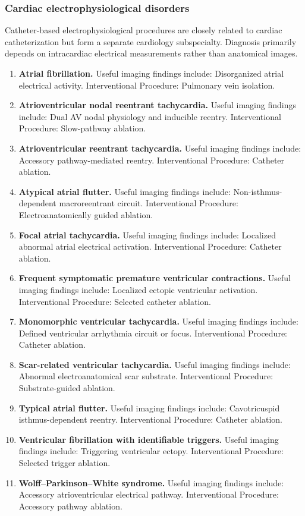 \subsubsection{Cardiac electrophysiological disorders}
Catheter-based electrophysiological procedures are closely related to cardiac catheterization but form a separate cardiology subspecialty. Diagnosis primarily depends on intracardiac electrical measurements rather than anatomical images.
\begin{enumerate}[leftmargin=*,itemsep=0.45em,topsep=0.4em]
\item \textbf{Atrial fibrillation.} Useful imaging findings include: Disorganized atrial electrical activity. Interventional Procedure: Pulmonary vein isolation.
\item \textbf{Atrioventricular nodal reentrant tachycardia.} Useful imaging findings include: Dual AV nodal physiology and inducible reentry. Interventional Procedure: Slow-pathway ablation.
\item \textbf{Atrioventricular reentrant tachycardia.} Useful imaging findings include: Accessory pathway-mediated reentry. Interventional Procedure: Catheter ablation.
\item \textbf{Atypical atrial flutter.} Useful imaging findings include: Non-isthmus-dependent macroreentrant circuit. Interventional Procedure: Electroanatomically guided ablation.
\item \textbf{Focal atrial tachycardia.} Useful imaging findings include: Localized abnormal atrial electrical activation. Interventional Procedure: Catheter ablation.
\item \textbf{Frequent symptomatic premature ventricular contractions.} Useful imaging findings include: Localized ectopic ventricular activation. Interventional Procedure: Selected catheter ablation.
\item \textbf{Monomorphic ventricular tachycardia.} Useful imaging findings include: Defined ventricular arrhythmia circuit or focus. Interventional Procedure: Catheter ablation.
\item \textbf{Scar-related ventricular tachycardia.} Useful imaging findings include: Abnormal electroanatomical scar substrate. Interventional Procedure: Substrate-guided ablation.
\item \textbf{Typical atrial flutter.} Useful imaging findings include: Cavotricuspid isthmus-dependent reentry. Interventional Procedure: Catheter ablation.
\item \textbf{Ventricular fibrillation with identifiable triggers.} Useful imaging findings include: Triggering ventricular ectopy. Interventional Procedure: Selected trigger ablation.
\item \textbf{Wolff--Parkinson--White syndrome.} Useful imaging findings include: Accessory atrioventricular electrical pathway. Interventional Procedure: Accessory pathway ablation.
\end{enumerate}

